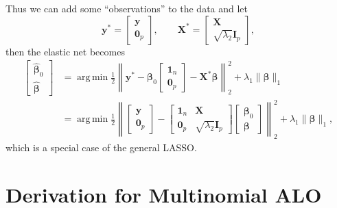 \documentclass[11pt]{article}
\newcommand{\by}{\bm{y}}
\newcommand{\bX}{\bm{X}}
\newcommand{\bbeta}{\bm{\beta}}
\newcommand{\bZero}{\bm{0}}
\newcommand{\bOne}{\bm{1}}
\DeclareMathOperator*{\argmin}{arg\,min}
\begin{document}
Thus we can add some ``observations'' to the data and let
$$\by^\ast = \begin{bmatrix}
\by \\
\bm0_p
\end{bmatrix},\qquad \bX^\ast =
\begin{bmatrix}
\bX \\
\sqrt{\lambda_2} \bm{I}_p
\end{bmatrix}, $$
then the elastic net becomes
	\begin{equation}
		\begin{aligned}
		\begin{bmatrix}
		\hat{\bbeta}_0 \\
		\hat{\bbeta}
		\end{bmatrix} &= \argmin\frac{1}{2} \left\|\by^\ast - \bbeta_0
		\begin{bmatrix}
		\bOne_n \\
		\bZero_p
		\end{bmatrix} - \bX^\ast\bbeta\right\|_2^2 + \lambda_1 \|\bbeta\|_1  \\
		&= \argmin\frac{1}{2} \left\|
		\begin{bmatrix}
		\by \\
		\bm0_p
		\end{bmatrix}
		- 
		\begin{bmatrix}
		\bOne_n & \bX \\
		\bZero_p &\sqrt{\lambda_2} \bm{I}_p
		\end{bmatrix}  
		\begin{bmatrix}
		\bbeta_0 \\
		\bbeta
		\end{bmatrix} 
		\right \|_2^2 + \lambda_1 \|\bbeta\|_1,
		\end{aligned}
	\end{equation}
which is a special case of the general LASSO.

\section{Derivation for Multinomial ALO}
\end{document}
